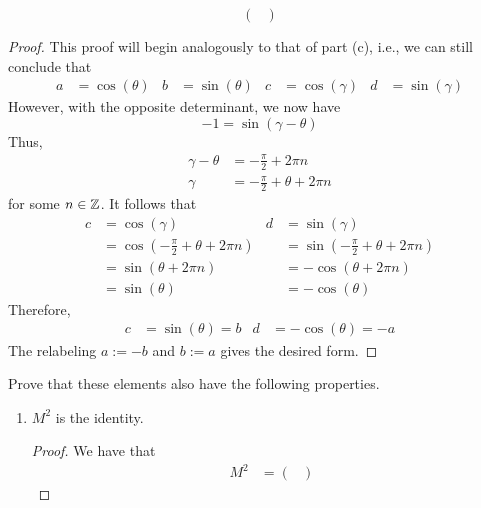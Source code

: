 \documentclass[../psets.tex]{subfiles}
\begin{document}
\begin{enumerate}
\begin{enumerate}
\begin{equation*}
\begin{pmatrix}
            \end{pmatrix}
        \end{equation*}
        \begin{proof}
            This proof will begin analogously to that of part (c), i.e., we can still conclude that
            \begin{align*}
                a &= \cos(\theta)&
                b &= \sin(\theta)&
                c &= \cos(\gamma)&
                d &= \sin(\gamma)
            \end{align*}
            However, with the opposite determinant, we now have
            \begin{equation*}
                -1 = \sin(\gamma-\theta)
            \end{equation*}
            Thus,
            \begin{align*}
                \gamma-\theta &= -\frac{\pi}{2}+2\pi n\\
                \gamma &= -\frac{\pi}{2}+\theta+2\pi n
            \end{align*}
            for some $n\in\mathbb{Z}$. It follows that
            \begin{align*}
                c &= \cos(\gamma)&
                    d &= \sin(\gamma)\\
                &= \cos(-\frac{\pi}{2}+\theta+2\pi n)&
                    &= \sin(-\frac{\pi}{2}+\theta+2\pi n)\\
                &= \sin(\theta+2\pi n)&
                    &= -\cos(\theta+2\pi n)\\
                &= \sin(\theta)&
                    &= -\cos(\theta)
            \end{align*}
            Therefore,
            \begin{align*}
                c &= \sin(\theta) = b&
                d &= -\cos(\theta) = -a
            \end{align*}
            The relabeling $a:=-b$ and $b:=a$ gives the desired form.
        \end{proof}
        Prove that these elements also have the following properties.
        \begin{enumerate}
            \item $M^2$ is the identity.
            \begin{proof}
                We have that
                \begin{align*}
                    M^2 &=
                    \begin{pmatrix}

\end{pmatrix}
\end{align*}
\end{proof}
\end{enumerate}
\end{enumerate}
\end{enumerate}
\end{document}
